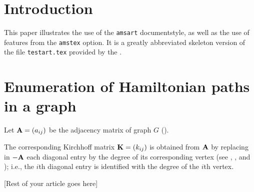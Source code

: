\date{July 25, 1994}


\maketitle

\begin{abstract}
This paper is a sample illustrating  the use
of the American Mathematical Society preprint
documentstyle, \verb+amsart+, and the use of bibliography
databases. It should be processed with \AmS-\LaTeX\ first,
then ran through \BibTeX, and through \AmS-\LaTeX\ at least
once more.
\end{abstract}

\section{Introduction}
\label{intro}
This paper illustrates the use of the {\tt amsart} documentstyle, as
well as the use of features from the {\tt amstex} option.  It is a 
greatly abbreviated skeleton version of the file {\tt testart.tex}
provided by the \AmS. 

\section{Enumeration of Hamiltonian paths in a graph}
Let $\bold A=(a_{ij})$ be the adjacency matrix of
graph $G$ (\cite{lewi:plur86}). 

The corresponding Kirchhoff matrix $\bold K=(k_{ij})$ is obtained from 
$\bold A$ by replacing in $-\bold A$ each diagonal entry by the degree of its
corresponding vertex (see \cite{chom:barr86}, \cite{barw:mode89}, and
\cite{chel:moda80}); i.e., the $i$th diagonal entry is identified
with the degree of the $i$th vertex.

[Rest of your article goes here]






